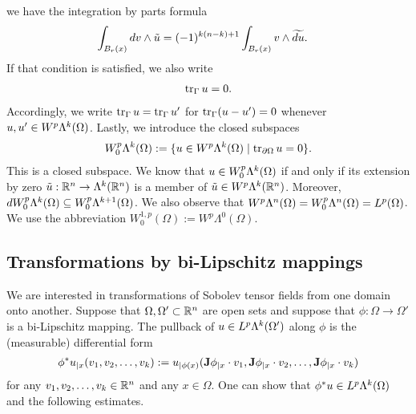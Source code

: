 \documentclass[10pt,a4paper]{article}
\newcommand{\todo}[1]{{\colorbox{yellow}{#1}}}
\newcommand\cye[1]{%
\protect\leavevmode
\begingroup
    \color{blue}%
    #1%
\endgroup
}
\begin{document}
we have the integration by parts formula
\begin{align*}
    \int_{B_r(x)} d v \wedge \tilde u
    &=
    (-1)^{k(n-k)+1}
    \int_{B_r(x)} v \wedge \widetilde{d u}
    .
\end{align*}
If that condition is satisfied, we also write 
\begin{align*}
    \operatorname{tr}_{\Gamma} u = 0
    .
\end{align*}
Accordingly, we write $\operatorname{tr}_{\Gamma} u = \operatorname{tr}_{\Gamma} u'$ for $\operatorname{tr}_{\Gamma} (u-u') = 0$ whenever $u, u' \in W^{p}\Lambda^{k}(\Omega)$.
Lastly, we introduce the closed subspaces 
\begin{gather*}
    W^{p}_{0}\Alt^{k}(\Omega) 
    := 
    \{ u \in W^{p}\Alt^{k}(\Omega) \suchthat \trace_{\partial \Omega} u = 0 \}
    .
\end{gather*}
This is a closed subspace. We know that $u \in W^{p}_{0}\Lambda^{k}(\Omega)$ if and only if its extension by zero $\tilde u : {\mathbb R}^{n} \rightarrow \Lambda^{k}({\mathbb R}^{n})$ is a member of $\tilde u \in W^{p}\Lambda^{k}({\mathbb R}^{n})$. Moreover, $d W^{p}_{0}\Lambda^{k}(\Omega) \subseteq W^{p}_{0}\Lambda^{k+1}(\Omega)$. We also observe that $W^{p}\Lambda^{n}(\Omega) = W^{p}_{0}\Lambda^{n}(\Omega) = L^{p}(\Omega)$. We use the abbreviation $W^{1,p}_{0}(\Omega) := W^{p}\Lambda^{0}(\Omega)$. 


\subsection{Transformations by bi-Lipschitz mappings}

We are interested in transformations of Sobolev tensor fields from one domain onto another. 
Suppose that $\Omega,\Omega' \subset {\mathbb R}^{n}$ are open sets and suppose that $\phi: \Omega \to \Omega'$ is a bi-Lipschitz mapping.
The pullback of $u \in L^{p}\Lambda^{k}(\Omega')$ along $\phi$ is the (measurable) differential form 
\begin{align} \label{equation:pullback}
    \phi^{\ast}u_{|x}( v_{1}, v_{2}, \ldots, v_{k} ) 
    := 
    u_{|\phi(x)}( {\mathbf{J}}\phi_{|x} \cdot v_1, {\mathbf{J}}\phi_{|x} \cdot v_2, \ldots, {\mathbf{J}}\phi_{|x} \cdot v_k ) 
\end{align}
for any $v_1, v_2, \dots, v_k \in {\mathbb R}^{n}$ and any $x \in \Omega$. 
One can show that $\phi^{\ast}u \in L^{p}\Lambda^{k}(\Omega)$ and the following estimates.
\end{document}
